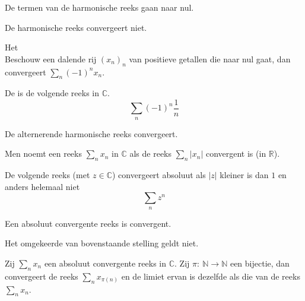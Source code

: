 \documentclass[main.tex]{subfiles}
\begin{document}
\begin{st}
  De termen van de harmonische reeks gaan naar nul.
\end{st}

\begin{st}
  De harmonische reeks convergeert niet.
\end{st}

\begin{st}
  Het \\
  Beschouw een dalende rij $(x_{n})_{n}$ van positieve getallen die naar nul gaat, dan convergeert $\sum_{n}(-1)^{n}x_{n}$.
\end{st}

\begin{de}
  De  is de volgende reeks in $\mathbb{C}$.
  \[ \sum_{n}(-1)^{n}\frac{1}{n} \]
\end{de}

\begin{st}
  De alternerende harmonische reeks convergeert.
\end{st}


\begin{de}
  Men noemt een reeks $\sum_{n}x_{n}$ in $\mathbb{C}$  als de reeks $\sum_{n}|x_{n}|$ convergent is (in $\mathbb{R}$).
\end{de}

\begin{vb}
  De volgende reeks (met $z\in \mathbb{C}$) convergeert absoluut als $|z|$ kleiner is dan $1$ en anders helemaal niet
  \[ \sum_{n}z^{n} \]
\end{vb}

\begin{bpr}
  Een absoluut convergente reeks is convergent.
\end{bpr}

\begin{tvb}
  Het omgekeerde van bovenstaande stelling geldt niet.
\end{tvb}

\begin{bst}
  Zij $\sum_{n}x_{n}$ een absoluut convergente reeks in $\mathbb{C}$.
  Zij $\pi:\ \mathbb{N} \rightarrow \mathbb{N}$ een bijectie, dan convergeert de reeks $\sum_{n}x_{\pi(n)}$ en de limiet ervan is dezelfde als die van de reeks $\sum_{n}x_{n}$.
\end{bst}
\end{document}
